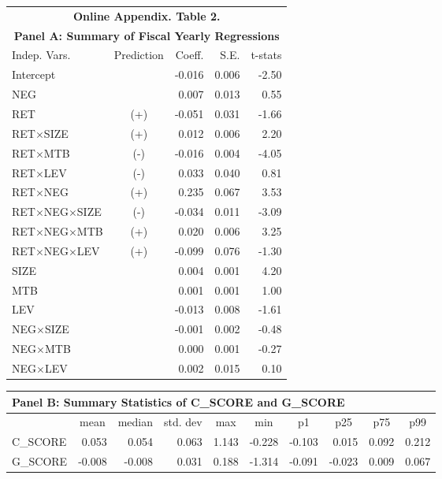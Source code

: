 \begin{table}[htbp] \label{oat2}
  \centering
    \begin{tabular}{lcrrr}
    \multicolumn{5}{c}{\textbf{Online Appendix. Table 2.}} \\
    \multicolumn{5}{c}{\textbf{Panel A: Summary of Fiscal Yearly Regressions}} \\
    \midrule
    \midrule
    Indep. Vars. & Prediction & Coeff. & S.E. & t-stats \\
    \midrule
    Intercept &   & -0.016 & 0.006 & -2.50 \\
    NEG &   & 0.007 & 0.013 & 0.55 \\
    RET & (+) & -0.051 & 0.031 & -1.66 \\
    RET$\times$SIZE & (+) & 0.012 & 0.006 & 2.20 \\
    RET$\times$MTB & (-) & -0.016 & 0.004 & -4.05 \\
    RET$\times$LEV & (-) & 0.033 & 0.040 & 0.81 \\
    RET$\times$NEG & (+) & 0.235 & 0.067 & 3.53 \\
    RET$\times$NEG$\times$SIZE & (-) & -0.034 & 0.011 & -3.09 \\
    RET$\times$NEG$\times$MTB & (+) & 0.020 & 0.006 & 3.25 \\
    RET$\times$NEG$\times$LEV & (+) & -0.099 & 0.076 & -1.30 \\
    SIZE &   & 0.004 & 0.001 & 4.20 \\
    MTB &   & 0.001 & 0.001 & 1.00 \\
    LEV &   & -0.013 & 0.008 & -1.61 \\
    NEG$\times$SIZE &   & -0.001 & 0.002 & -0.48 \\
    NEG$\times$MTB &   & 0.000 & 0.001 & -0.27 \\
    NEG$\times$LEV &   & 0.002 & 0.015 & 0.10 \\
    \bottomrule
    \bottomrule
    \end{tabular}%
\end{table}%

\begin{table}[htbp]
	\centering
	\begin{tabular}{lrrrrrrrrr}
		\multicolumn{10}{l}{\textbf{Panel B: Summary Statistics of C\_SCORE and G\_SCORE}}  \\
		\midrule
		\midrule
		& \multicolumn{1}{c}{mean} & \multicolumn{1}{c}{median} & \multicolumn{1}{c}{std. dev} & \multicolumn{1}{c}{max} & \multicolumn{1}{c}{min} & \multicolumn{1}{c}{p1} & \multicolumn{1}{c}{p25} & \multicolumn{1}{c}{p75} & \multicolumn{1}{c}{p99} \\
		\midrule
		C\_SCORE & 0.053 & 0.054 & 0.063 & 1.143 & -0.228 & -0.103 & 0.015 & 0.092 & 0.212 \\
		G\_SCORE & -0.008 & -0.008 & 0.031 & 0.188 & -1.314 & -0.091 & -0.023 & 0.009 & 0.067 \\
		\bottomrule
		\bottomrule
	\end{tabular}%
\end{table}%
